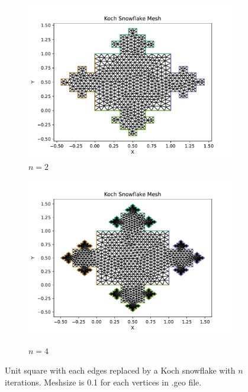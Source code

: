 \documentclass[12pt]{article}%
\theoremstyle{plain}
\numberwithin{equation}{section}
\begin{document}
  \begin{figure}[H]%
    \centering
         \begin{subfigure}[h]{0.45\linewidth}
         \caption{$n=2$}
\includegraphics[width=\linewidth]{figures/Ex3/Ex3_snow_square_2.pdf}
\end{subfigure}
 \begin{subfigure}[h]{0.45\linewidth}
 \caption{$n=4$}
\includegraphics[width=\linewidth]{figures/Ex3/Ex3_snow_square_4.pdf}
\label{Ex3_domain}
\end{subfigure}
  \caption{Unit square with each edges replaced by a Koch snowflake with $n$ iterations. Meshsize is 0.1 for each vertices in .geo file.}
  \label{fig:snow_2d_Dirichlet}
 \end{figure}
\end{document}
